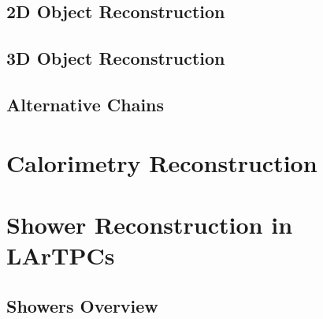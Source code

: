 \subsection{2D Object Reconstruction}\label{sec:2DReconstruction}

\subsection{3D Object Reconstruction}\label{sec:3DReconstruction}

\subsection{Alternative Chains}\label{sec:AlternativeChains}

\section{Calorimetry Reconstruction}\label{sec:Calorimetry}

\section{Shower Reconstruction in LArTPCs}\label{sec:ShowerReconstruction}

\subsection{Showers Overview}\label{sec:ShowersOverview}

